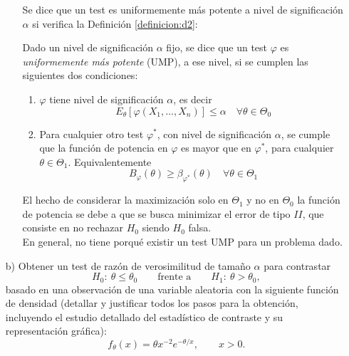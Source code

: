 \documentclass[12pt]{article}
\begin{document}
\begin{ejercicio}[2,4 puntos]
\begin{enumerate}
\begin{enumerate}
                Se dice que un test es uniformemente más potente a nivel de significación $\alpha$ si verifica 
                la Definición \ref{definicion:d2}:
                \begin{definicion}\label{definicion:d2}
                    Dado un nivel de significación $\alpha$ fijo, se dice que un test $\varphi$ es \textit{uniformemente
                    más potente} (UMP), a ese nivel, si se cumplen las siguientes dos condiciones:
                    \begin{enumerate}
                        \item $\varphi$ tiene nivel de significación $\alpha$, es decir
                        $$E_\theta[\varphi(X_1, \ldots, X_n)] \leqslant \alpha \quad \forall \theta \in \Theta_0$$
                        \item Para cualquier otro test $\varphi^{*}$, con nivel de significación $\alpha$, se cumple
                        que la función de potencia en $\varphi$ es mayor que en $\varphi^{*}$, para cualquier $\theta \in 
                        \Theta_1$. Equivalentemente
                        $$B_\varphi(\theta) \geqslant \beta_{\varphi^{*}}(\theta) \quad \forall \theta \in \Theta_1$$
                    \end{enumerate}
                \end{definicion}
                El hecho de considerar la maximización solo en $\Theta_1$ y no en $\Theta_0$ la función de potencia
                se debe a que se busca minimizar el error de tipo $II$, que consiste en no 
                rechazar $H_0$ siendo $H_0$ falsa. \\

                En general, no tiene porqué existir un test UMP para un problema dado.
            \end{enumerate}

            \item[b)] Obtener un test de razón de verosimilitud de tamaño $\alpha$ para contrastar
            $$
            H_0:\ \theta \le \theta_0
            \qquad \text{frente a} \qquad
            H_1:\ \theta > \theta_0,
            $$
            basado en una observación de una variable aleatoria con la siguiente función de densidad
            (detallar y justificar todos los pasos para la obtención, incluyendo el estudio detallado
            del estadístico de contraste y su representación gráfica):
            $$
            f_\theta(x)=\theta x^{-2} e^{-\theta/x}, \qquad x>0.
            $$


\end{enumerate}
\end{ejercicio}
\end{document}
